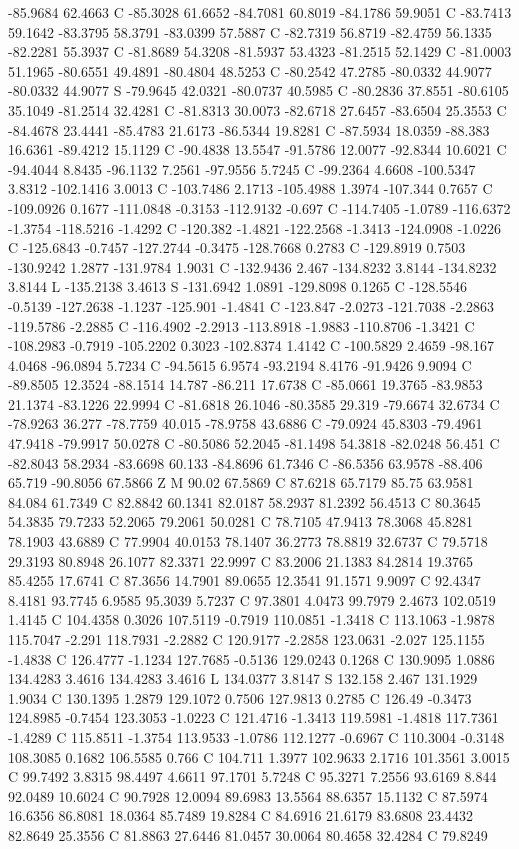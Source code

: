 {{{-85.9684 62.4663 C -85.3028 61.6652 -84.7081 60.8019 -84.1786 59.9051 C -83.7413 59.1642 -83.3795 58.3791 -83.0399 57.5887 C -82.7319 56.8719 -82.4759 56.1335 -82.2281 55.3937 C -81.8689 54.3208 -81.5937 53.4323 -81.2515 52.1429 C -81.0003 51.1965 -80.6551 49.4891 -80.4804 48.5253 C -80.2542 47.2785 -80.0332 44.9077 -80.0332 44.9077 S -79.9645 42.0321 -80.0737 40.5985 C -80.2836 37.8551 -80.6105 35.1049 -81.2514 32.4281 C -81.8313 30.0073 -82.6718 27.6457 -83.6504 25.3553 C -84.4678 23.4441 -85.4783 21.6173 -86.5344 19.8281 C -87.5934 18.0359 -88.383 16.6361 -89.4212 15.1129 C -90.4838 13.5547 -91.5786 12.0077 -92.8344 10.6021 C -94.4044 8.8435 -96.1132 7.2561 -97.9556 5.7245 C -99.2364 4.6608 -100.5347 3.8312 -102.1416 3.0013 C -103.7486 2.1713 -105.4988 1.3974 -107.344 0.7657 C -109.0926 0.1677 -111.0848 -0.3153 -112.9132 -0.697 C -114.7405 -1.0789 -116.6372 -1.3754 -118.5216 -1.4292 C -120.382 -1.4821 -122.2568 -1.3413 -124.0908 -1.0226 C -125.6843 -0.7457 -127.2744 -0.3475 -128.7668 0.2783 C -129.8919 0.7503 -130.9242 1.2877 -131.9784 1.9031 C -132.9436 2.467 -134.8232 3.8144 -134.8232 3.8144 L -135.2138 3.4613 S -131.6942 1.0891 -129.8098 0.1265 C -128.5546 -0.5139 -127.2638 -1.1237 -125.901 -1.4841 C -123.847 -2.0273 -121.7038 -2.2863 -119.5786 -2.2885 C -116.4902 -2.2913 -113.8918 -1.9883 -110.8706 -1.3421 C -108.2983 -0.7919 -105.2202 0.3023 -102.8374 1.4142 C -100.5829 2.4659 -98.167 4.0468 -96.0894 5.7234 C -94.5615 6.9574 -93.2194 8.4176 -91.9426 9.9094 C -89.8505 12.3524 -88.1514 14.787 -86.211 17.6738 C -85.0661 19.3765 -83.9853 21.1374 -83.1226 22.9994 C -81.6818 26.1046 -80.3585 29.319 -79.6674 32.6734 C -78.9263 36.277 -78.7759 40.015 -78.9758 43.6886 C -79.0924 45.8303 -79.4961 47.9418 -79.9917 50.0278 C -80.5086 52.2045 -81.1498 54.3818 -82.0248 56.451 C -82.8043 58.2934 -83.6698 60.133 -84.8696 61.7346 C -86.5356 63.9578 -88.406 65.719 -90.8056 67.5866 Z M 90.02 67.5869 C 87.6218 65.7179 85.75 63.9581 84.084 61.7349 C 82.8842 60.1341 82.0187 58.2937 81.2392 56.4513 C 80.3645 54.3835 79.7233 52.2065 79.2061 50.0281 C 78.7105 47.9413 78.3068 45.8281 78.1903 43.6889 C 77.9904 40.0153 78.1407 36.2773 78.8819 32.6737 C 79.5718 29.3193 80.8948 26.1077 82.3371 22.9997 C 83.2006 21.1383 84.2814 19.3765 85.4255 17.6741 C 87.3656 14.7901 89.0655 12.3541 91.1571 9.9097 C 92.4347 8.4181 93.7745 6.9585 95.3039 5.7237 C 97.3801 4.0473 99.7979 2.4673 102.0519 1.4145 C 104.4358 0.3026 107.5119 -0.7919 110.0851 -1.3418 C 113.1063 -1.9878 115.7047 -2.291 118.7931 -2.2882 C 120.9177 -2.2858 123.0631 -2.027 125.1155 -1.4838 C 126.4777 -1.1234 127.7685 -0.5136 129.0243 0.1268 C 130.9095 1.0886 134.4283 3.4616 134.4283 3.4616 L 134.0377 3.8147 S 132.158 2.467 131.1929 1.9034 C 130.1395 1.2879 129.1072 0.7506 127.9813 0.2785 C 126.49 -0.3473 124.8985 -0.7454 123.3053 -1.0223 C 121.4716 -1.3413 119.5981 -1.4818 117.7361 -1.4289 C 115.8511 -1.3754 113.9533 -1.0786 112.1277 -0.6967 C 110.3004 -0.3148 108.3085 0.1682 106.5585 0.766 C 104.711 1.3977 102.9633 2.1716 101.3561 3.0015 C 99.7492 3.8315 98.4497 4.6611 97.1701 5.7248 C 95.3271 7.2556 93.6169 8.844 92.0489 10.6024 C 90.7928 12.0094 89.6983 13.5564 88.6357 15.1132 C 87.5974 16.6356 86.8081 18.0364 85.7489 19.8284 C 84.6916 21.6179 83.6808 23.4432 82.8649 25.3556 C 81.8863 27.6446 81.0457 30.0064 80.4658 32.4284 C 79.8249 }}}
